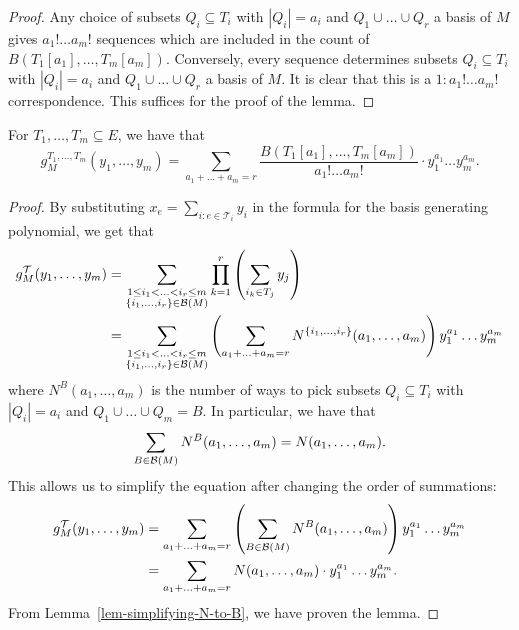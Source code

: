\documentclass{puthesis-UG}
\begin{document}
\begin{proof}
	Any choice of subsets $Q_i \subseteq T_i$ with $|Q_i| = a_i$ and $Q_1 \cup \ldots \cup Q_r$ a basis of $M$ gives $a_1! \ldots a_m!$ sequences which are included in the count of $B(T_1[a_1], \ldots, T_m[a_m])$. Conversely, every sequence determines subsets $Q_i \subseteq T_i$ with $|Q_i| = a_i$ and $Q_1 \cup \ldots \cup Q_r$ a basis of $M$. It is clear that this is a $1 : a_1! \ldots a_m!$ correspondence. This suffices for the proof of the lemma. 
\end{proof}

\begin{prop}
	For $T_1, \ldots, T_m \subseteq E$, we have that 
	\[	
		g_M^{T_1, \ldots, T_m} (y_1, \ldots, y_m) = \sum_{a_1 + \ldots + a_m = r} \frac{B(T_1[a_1], \ldots, T_m[a_m])}{a_1! \ldots a_m!} \cdot y_1^{a_1} \ldots y_m^{a_m}.
	\]
\end{prop}

\begin{proof}
	By substituting $x_e = \sum_{i : e \in \mathcal{T}_i} y_i$ in the formula for the basis generating polynomial, we get that 
	\begin{align*}
		g_M^{\mathcal{T}}(y_1, \ldots, y_m) & = \sum_{\substack{1 \leq i_1 < \ldots < i_r \leq m \\ \{i_1, \ldots, i_r\} \in \mathcal{B}(M)}} \prod_{k = 1}^r \left ( \sum_{i_k \in T_j} y_j \right ) \\
		& = \sum_{\substack{1 \leq i_1 < \ldots < i_r \leq m \\ \{i_1, \ldots, i_r\} \in \mathcal{B}(M)}} \left (\sum_{a_1 + \ldots + a_m = r} N^{\{i_1, \ldots, i_r\}}(a_1, \ldots, a_m) \right ) y_1^{a_1} \ldots y_m^{a_m}
	\end{align*}
	where $N^B(a_1, \ldots, a_m)$ is the number of ways to pick subsets $Q_i \subseteq T_i$ with $|Q_i| = a_i$ and $Q_1 \cup \ldots \cup Q_m = B$. In particular, we have that 
	\[	
		\sum_{B \in \mathcal{B}(M)} N^B (a_1, \ldots, a_m) = N(a_1, \ldots, a_m). 
	\]
	This allows us to simplify the equation after changing the order of summations: 
	\begin{align*}
		g_M^{\mathcal{T}}(y_1, \ldots, y_m) & = \sum_{a_1 + \ldots + a_m = r} \left ( \sum_{B \in \mathcal{B}(M)} N^B (a_1, \ldots, a_m) \right ) y_1^{a_1} \ldots y_m^{a_m} \\
		& = \sum_{a_1 + \ldots + a_m = r} N(a_1, \ldots, a_m) \cdot y_1^{a_1} \ldots y_m^{a_m}.
	\end{align*}
	From Lemma~\ref{lem-simplifying-N-to-B}, we have proven the lemma. 
\end{proof}
\end{document}
